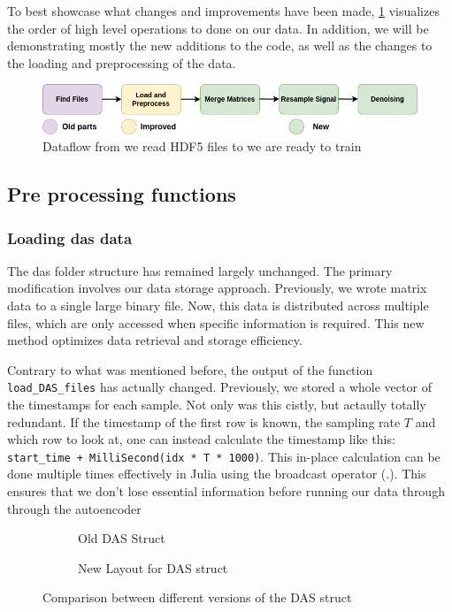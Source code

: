 To best showcase what changes and improvements have been made, \ref{fig:apiflow} visualizes the order of high level operations to done on our data. In addition, we will be demonstrating mostly the new additions to the code, as well as the changes to the loading and preprocessing of the data. \\

\begin{figure}[h]
    \centering
    \includegraphics[scale=0.5]{figures/dataflow.png}
    \caption{Dataflow from we read HDF5 files to we are ready to train}
    \label{fig:apiflow}
\end{figure}

\subsection{Pre processing functions}

\subsubsection{Loading \acrshort{das} data}

The \acrshort{das} folder structure has remained largely unchanged. The primary modification involves our data storage approach. Previously, we wrote matrix data to a single large binary file. Now, this data is distributed across multiple files, which are only accessed when specific information is required. This new method optimizes data retrieval and storage efficiency.

Contrary to what was mentioned before, the output of the function \texttt{load\_DAS\_files} has actually changed. Previously, we stored a whole vector of the timestamps for each sample. Not only was this cistly, but actaully totally redundant. If the timestamp of the first row is known, the sampling rate $T$ and which row to look at, one can instead calculate the timestamp like this: 
\lstinline|start_time + MilliSecond(idx * T * 1000)|. This in-place calculation can be done multiple times effectively in Julia using the broadcast operator (.). This ensures that we don't lose essential information before running our data through through the autoencoder

\begin{figure}[h]
\centering
\begin{subfigure}{.45\textwidth}
  \centering
  
  \caption{Old DAS Struct}
  \label{fig:olddasstc}
\end{subfigure}%
\hfill
\begin{subfigure}{.45\textwidth}
  \centering
  
  \caption{New Layout for DAS struct}
  \label{fig:newdasstc}
\end{subfigure}
\caption{Comparison between different versions of the DAS struct}
\label{fig:dasstccmp}
\end{figure}

